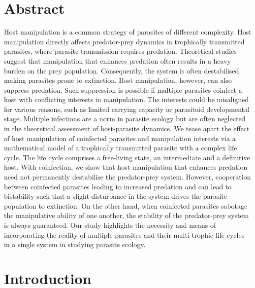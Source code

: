 \documentclass[11pt]{article}
\begin{document}
\section*{Abstract}
Host manipulation is a common strategy of parasites of different complexity. 
Host manipulation directly affects predator-prey dynamics in trophically transmitted parasites, where parasite transmission requires predation. Theoretical studies suggest that manipulation that enhances predation often results in a heavy burden on the prey population. 
Consequently, the system is often destabilised, making parasites prone to extinction. 
Host manipulation, however, can also suppress predation.
Such suppression is possible if multiple parasites coinfect a host with conflicting interests in manipulation. 
The interests could be misaligned for various reasons, such as limited carrying capacity or parasitoid developmental stage.
Multiple infections are a norm in parasite ecology but are often neglected in the theoretical assessment of host-parasite dynamics.
We tease apart the effect of host manipulation of coinfected parasites and manipulation interests via a mathematical model of a trophically transmitted parasite with a complex life cycle.
The life cycle comprises a free-living state, an intermediate and a definitive host. 
With coinfection, we show that host manipulation that enhances predation need not permanently destabilise the predator-prey system. 
However, cooperation between coinfected parasites leading to increased predation and can lead to bistability such that a slight disturbance in the system drives the parasite population to extinction. 
On the other hand, when coinfected parasites sabotage the manipulative ability of one another, the stability of the predator-prey system is always guaranteed.
Our study highlights the necessity and means of incorporating the reality of multiple parasites and their multi-trophic life cycles in a single system in studying parasite ecology.

\newpage{}

\section*{Introduction}

\end{document}

